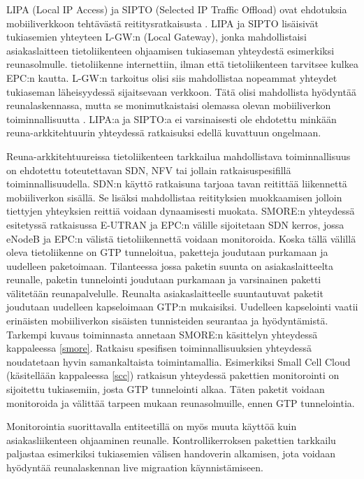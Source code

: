 LIPA (Local IP Access) ja SIPTO (Selected IP Traffic Offload) ovat ehdotuksia mobiiliverkkoon tehtävästä reititysratkaisusta \cite{samdanis2012traffic,3gpplipa}.
LIPA ja SIPTO lisäisivät tukiasemien yhteyteen L-GW:n (Local Gateway), jonka mahdollistaisi asiakaslaitteen tietoliikenteen ohjaamisen tukiaseman yhteydestä esimerkiksi reunasolmulle. tietoliikenne internettiin, ilman että tietoliikenteen tarvitsee kulkea EPC:n kautta. 
L-GW:n tarkoitus olisi siis mahdollistaa nopeammat yhteydet tukiaseman läheisyydessä sijaitsevaan verkkoon. Tätä olisi mahdollista hyödyntää reunalaskennassa, mutta se monimutkaistaisi olemassa olevan mobiiliverkon toiminnallisuutta \cite{cho2014smore}.
LIPA:a ja SIPTO:a ei varsinaisesti ole ehdotettu minkään reuna-arkkitehtuurin yhteydessä ratkaisuksi edellä kuvattuun ongelmaan. 

Reuna-arkkitehtuureissa tietoliikenteen tarkkailua mahdollistava toiminnallisuus on ehdotettu toteutettavan SDN, NFV tai jollain ratkaisuspesifillä toiminnallisuudella. 
SDN:n käyttö ratkaisuna tarjoaa tavan reitittää liikennettä mobiiliverkon sisällä. Se lisäksi mahdollistaa reitityksien muokkaamisen jolloin tiettyjen yhteyksien reittiä voidaan dynaamisesti muokata. SMORE:n yhteydessä esitetyssä ratkaisussa  E-UTRAN ja EPC:n välille sijoitetaan SDN kerros, jossa eNodeB ja EPC:n välistä tietoliikennettä voidaan monitoroida. 
Koska tällä välillä oleva tietoliikenne on GTP tunneloitua, paketteja joudutaan purkamaan ja uudelleen paketoimaan. 
Tilanteessa jossa paketin suunta on asiakaslaitteelta reunalle, paketin tunnelointi joudutaan purkamaan ja varsinainen paketti välitetään reunapalvelulle. 
Reunalta asiakaslaitteelle suuntautuvat paketit joudutaan uudelleen kapseloimaan GTP:n mukaisiksi.
Uudelleen kapselointi vaatii erinäisten mobiiliverkon sisäisten tunnisteiden seurantaa ja hyödyntämistä.
Tarkempi kuvaus toiminnasta annetaan SMORE:n käsittelyn yhteydessä kappaleessa \ref{smore}.
Ratkaisu spesifisen toiminnallisuuksien yhteydessä noudatetaan hyvin samankaltaista toimintamallia. Esimerkiksi Small Cell Cloud (käsitellään kappaleessa \ref{scc}) ratkaisun yhteydessä pakettien monitorointi on sijoitettu tukiasemiin, josta GTP tunnelointi alkaa. Täten paketit voidaan monitoroida ja välittää tarpeen mukaan reunasolmuille, ennen GTP tunnelointia.

Monitorointia suorittavalla entiteetillä on myös muuta käyttöä kuin asiakasliikenteen ohjaaminen reunalle. Kontrollikerroksen pakettien tarkkailu paljastaa esimerkiksi tukiasemien välisen handoverin alkamisen, jota voidaan hyödyntää reunalaskennan live migraation käynnistämiseen.

